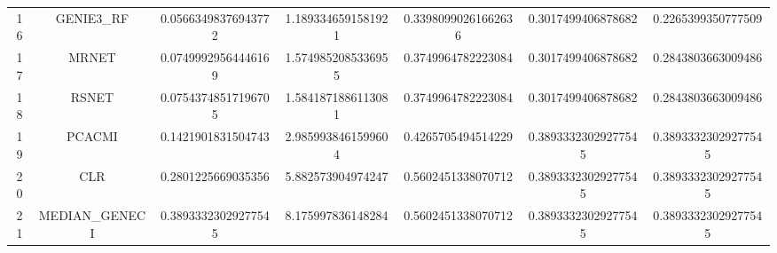 \documentclass[a4paper,10pt]{article}
\begin{document}
\begin{landscape}
\begin{table}[!htp]
\begin{tabular}{ccccccc}
16&GENIE3_RF&0.05663498376943772&1.1893346591581921&0.33980990261662636&0.3017499406878682&0.2265399350777509\\
17&MRNET&0.07499929564446169&1.5749852085336955&0.3749964782223084&0.3017499406878682&0.2843803663009486\\
18&RSNET&0.07543748517196705&1.5841871886113081&0.3749964782223084&0.3017499406878682&0.2843803663009486\\
19&PCACMI&0.1421901831504743&2.9859938461599604&0.4265705494514229&0.38933323029277545&0.38933323029277545\\
20&CLR&0.2801225669035356&5.882573904974247&0.5602451338070712&0.38933323029277545&0.38933323029277545\\
21&MEDIAN_GENECI&0.38933323029277545&8.175997836148284&0.5602451338070712&0.38933323029277545&0.38933323029277545\\
\hline
\end{tabular}
\end{table}


\end{landscape}
\end{document}
